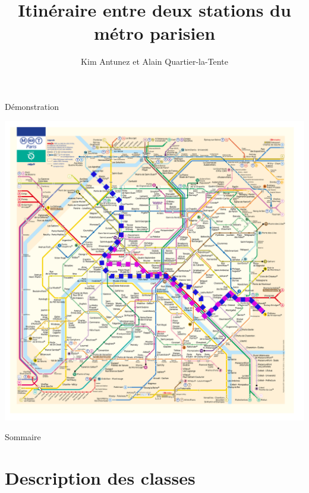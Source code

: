 \documentclass[10pt,xcolor=table,color={dvipsnames,usenames},ignorenonframetext,usepdftitle=false,french]{beamer}
\title{Itinéraire entre deux stations du métro parisien}
\author{Kim Antunez et Alain Quartier-la-Tente}
\date{}
\begin{document}
\begin{frame}
\titlepage
\end{frame}

\begin{frame}{Démonstration}
\protect\hypertarget{duxe9monstration}{}

\includegraphics[trim = 260px 330px 100px 160px, clip, height=\textheight]{img/plan_lignes/Plan-Metro_algo21.pdf}

\end{frame}

\begin{frame}{Sommaire}
\protect\hypertarget{sommaire}{}

\tableofcontents

\end{frame}

\hypertarget{description-des-classes}{%
\section{Description des classes}\label{description-des-classes}}
\end{document}
